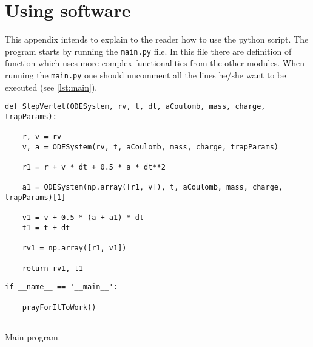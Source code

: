 \chapter{Using software}

This appendix intends to explain to the reader how to use the python script. The program starts by running the \verb|main.py| file. In this file there are definition of function which uses more complex functionalities from the other modules. When running the \verb|main.py| one should uncomment all the lines he/she want to be executed (see \ref{lst:main}).


\begin{Verbatim}
def StepVerlet(ODESystem, rv, t, dt, aCoulomb, mass, charge, trapParams):

    r, v = rv
    v, a = ODESystem(rv, t, aCoulomb, mass, charge, trapParams)
    
    r1 = r + v * dt + 0.5 * a * dt**2
    
    a1 = ODESystem(np.array([r1, v]), t, aCoulomb, mass, charge, trapParams)[1]    
    
    v1 = v + 0.5 * (a + a1) * dt
    t1 = t + dt
    
    rv1 = np.array([r1, v1])
    
    return rv1, t1   
\end{Verbatim}


\begin{listing}
\begin{lstlisting}
if __name__ == '__main__':
    
    prayForItToWork()
	    
\end{lstlisting}
\caption{Main program.}
\label{lst:main}
\end{listing}

